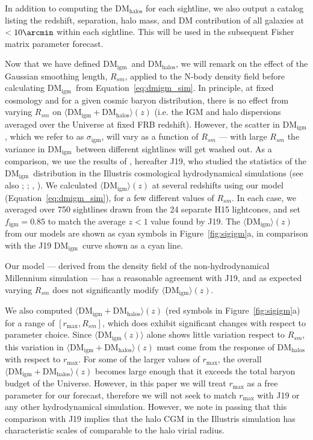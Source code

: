 \documentclass[twocolumn]{aastex63}
\newcommand{\dmhalo}{\ensuremath{\mathrm{DM}_\mathrm{halos}}}
\newcommand{\dmigm}{\ensuremath{\mathrm{DM}_\mathrm{igm}}}
\newcommand{\sigigm}{\ensuremath{\sigma_\mathrm{igm}}}
\newcommand{\figm}{\ensuremath{f_\mathrm{igm}}}
\newcommand{\rmax}{\ensuremath{r_\mathrm{max}}}
\begin{document}
\begin{CJK*}{UTF8}{gbsn}
In addition to computing the \dmhalo{} for each sightline, we also output a catalog listing the redshift, separation, halo mass, and DM contribution of
all galaxies at $<10\arcmin$ within each sightline. This will be used in the subsequent Fisher matrix parameter forecast.

Now that we have defined \dmigm\ and \dmhalo, we will remark on the effect of the Gaussian smoothing length, $R_{sm}$, applied to the 
N-body density field before calculating \dmigm\ from Equation~\ref{eq:dmigm_sim}. In principle, at fixed cosmology and for a given
cosmic baryon distribution, there is no effect from varying $R_{sm}$ on $\langle \dmigm + \dmhalo \rangle (z)$ 
(i.e. the IGM and halo dispersions averaged over the Universe
at fixed FRB redshift). 
However, the scatter in \dmigm, which we refer to as \sigigm, will vary as a function of $R_{sm}$ --- with large $R_{sm}$ the variance
in \dmigm\ between different sightlines will get washed out.
As a comparison, we use the results of \citet{jaroszynski:2019}, hereafter J19, who studied the statistics of
the \dmigm\ distribution in the Illustris cosmological hydrodynamical simulations (see also \citealt{takahashi:2020}; \citealt{zhu:2020}; \citealt{zhang:2021}, \citealt{batten:2021}).
We calculated $\langle \dmigm \rangle (z)$ at several redshifts using our model (Equation~\ref{eq:dmigm_sim}), for a few different values of $R_{sm}$.
In each case, we averaged over 750 sightlines drawn from the 24 separate H15 lightcones, 
and set $\figm=0.85$ to match the average $z<1$ value found by J19. 
The $\langle \dmigm \rangle (z)$ from our models are shown as cyan symbols in Figure~\ref{fig:sigigm}a, in comparison with the J19 \dmigm\ curve shown as a cyan line.

Our model --- derived from the density field of the non-hydrodynamical Millennium
simulation --- has a reasonable agreement with J19, and as expected varying $R_{sm}$ does not significantly modify $\langle \dmigm \rangle (z)$.

We also computed $\langle \dmigm + \dmhalo \rangle (z)$ 
 (red symbols in Figure~\ref{fig:sigigm}a) for a range of $[\rmax,R_{sm}]$,
 which does exhibit 
significant changes with respect to parameter choice. Since $\langle \dmigm (z)\rangle$ alone shows little variation respect to $R_{sm}$,
this variation in $\langle \dmigm + \dmhalo \rangle (z)$  must come from the response of \dmhalo{} with respect to \rmax{}.
For some of the larger values of \rmax{}, the overall $\langle \dmigm + \dmhalo \rangle (z)$ 
becomes large enough that it exceeds the total baryon budget of the Universe. 
However, in this paper we will treat \rmax{} as a free parameter for our forecast, 
therefore we will not seek to match \rmax{} with J19 or any other
hydrodynamical simulation. 
However, we note in passing that this comparison with J19 implies that the halo CGM in the Illustris
simulation has characteristic scales of comparable to the halo virial radius.


\end{CJK*}
\end{document}
